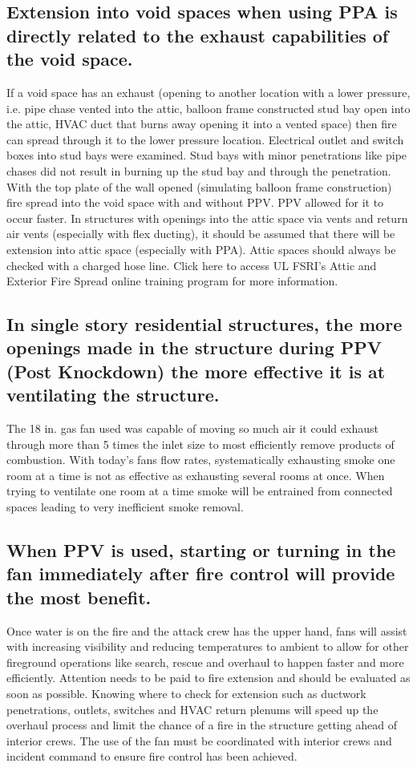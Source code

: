 \documentclass{article}
\begin{document}
\subsection{Extension into void spaces when using PPA is directly related to the exhaust capabilities of the void space.}
If a void space has an exhaust (opening to another location with a lower pressure, i.e. pipe chase vented into the attic, balloon frame constructed stud bay open into the attic, HVAC duct that burns away opening it into a vented space) then fire can spread through it to the lower pressure location.  Electrical outlet and switch boxes into stud bays were examined.  Stud bays with minor penetrations like pipe chases did not result in burning up the stud bay and through the penetration.  With the top plate of the wall opened (simulating balloon frame construction) fire spread into the void space with and without PPV.  PPV allowed for it to occur faster.  In structures with openings into the attic space via vents and return air vents (especially with flex ducting), it should be assumed that there will be extension into attic space (especially with PPA).  Attic spaces should always be checked with a charged hose line.  Click here to access UL FSRI’s Attic and Exterior Fire Spread online training program for more information.

\subsection{In single story residential structures, the more openings made in the structure during PPV (Post Knockdown) the more effective it is at ventilating the structure.}
The 18 in. gas fan used was capable of moving so much air it could exhaust through more than 5 times the inlet size to most efficiently remove products of combustion. With today’s fans flow rates, systematically exhausting smoke one room at a time is not as effective as exhausting several rooms at once.   When trying to ventilate one room at a time smoke will be entrained from connected spaces leading to very inefficient smoke removal.  

\subsection{When PPV is used, starting or turning in the fan immediately after fire control will provide the most benefit.}  Once water is on the fire and the attack crew has the upper hand, fans will assist with increasing visibility and reducing temperatures to ambient to allow for other fireground operations like search, rescue and overhaul to happen faster and more efficiently.  Attention needs to be paid to fire extension and should be evaluated as soon as possible.  Knowing where to check for extension such as ductwork penetrations, outlets, switches and HVAC return plenums will speed up the overhaul process and limit the chance of a fire in the structure getting ahead of interior crews.  The use of the fan must be coordinated with interior crews and incident command to ensure fire control has been achieved.  
\end{document}
